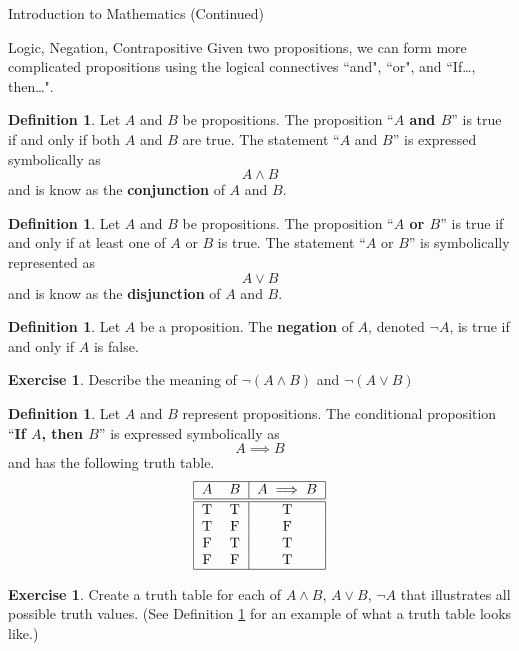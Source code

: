 \documentclass[11pt]{article}
\theoremstyle{definition}
\newtheorem{definition}[theorem]{Definition}
\newtheorem{exercise}[theorem]{Exercise}
\begin{document}
\begin{section}{Introduction to Mathematics (Continued)}
\begin{subsection}{Logic, Negation, Contrapositive}
Given two propositions, we can form more complicated propositions using the logical connectives ``and", ``or", and ``If\ldots, then\ldots".

\begin{definition} Let $A$ and $B$ be propositions.  The proposition ``\textbf{$A$ and $B$}'' is true if and only if both $A$ and $B$ are true.  The statement ``$A$ and $B$'' is expressed symbolically as 
$$
A \wedge B
$$
and is know as the \textbf{conjunction} of $A$ and $B$.
\end{definition}

\begin{definition}
Let $A$ and $B$ be propositions.  The proposition ``\textbf{$A$ or $B$}'' is true if and only if at least one of $A$ or $B$ is true.  The statement ``$A$ or $B$'' is symbolically represented as
$$
A \vee B
$$
and is know as the \textbf{disjunction} of $A$ and $B$.
\end{definition}

\begin{definition}
Let $A$ be a proposition.  The \textbf{negation} of $A$, denoted $\neg A$, is true if and only if $A$ is false.
\end{definition}

\begin{exercise} Describe the meaning of $\neg (A \wedge B)$ and $\neg (A \vee B)$\end{exercise}

\begin{definition}\label{def:conditional}
Let $A$ and $B$ represent propositions.  The conditional proposition ``\textbf{If $A$, then $B$}'' is expressed symbolically as 
$$
A \implies B
$$
and has the following truth table.
\[
\begin{tabular}{| c  c  | c |} \hline
$A$  &  $B$ & $A \implies B$  \\ \hline\hline
T & T & T  \\ 
T & F & F  \\ 
F & T & T  \\ 
F & F & T  \\ \hline
\end{tabular}
\]
\end{definition}

\begin{exercise}
Create a truth table for each of $A \wedge B$, $A \vee B$, $\neg A$ that illustrates all possible truth values.  (See Definition \ref{def:conditional} for an example of what a truth table looks like.)
\end{exercise}


\end{subsection}
\end{section}
\end{document}
